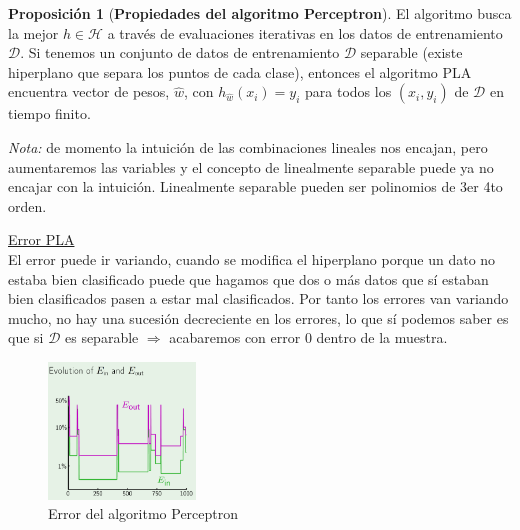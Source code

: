 \documentclass[11pt,a4paper]{article}
\theoremstyle{definition}
\newtheorem{proposition}{Proposición}[section]
\begin{document}
	\begin{proposition}[\bf Propiedades del algoritmo Perceptron]
	El algoritmo busca la mejor $h\in \mathcal{H}$ a través de evaluaciones iterativas en los datos de entrenamiento $\mathcal{D}$. Si tenemos un conjunto de datos de entrenamiento $\mathcal{D}$ separable (existe hiperplano que separa los puntos de cada clase), entonces el algoritmo PLA encuentra vector de pesos, $\hat w$, con $h_{\hat w}(x_i)=y_i$ para todos los $(x_i,y_i)$ de $\mathcal{D}$ en tiempo finito.
	
	\end{proposition}
	
	\textit{Nota:} de momento la intuición de las combinaciones lineales nos encajan, pero aumentaremos las variables y el concepto de linealmente separable puede ya no encajar con la intuición. Linealmente separable pueden ser polinomios de 3er 4to orden.
	
	\underline{Error PLA}\\
	El error puede ir variando, cuando se modifica el hiperplano porque un dato no estaba bien clasificado puede que hagamos que dos o más datos que sí estaban bien clasificados pasen a estar mal clasificados. Por tanto los errores van variando mucho, no hay una sucesión decreciente en los errores, lo que sí podemos saber es que si $\mathcal{D}$ es separable $\Rightarrow$ acabaremos con error 0 dentro de la muestra.
	
	\begin{figure}[H]
	\centering
	\includegraphics[width=0.35\textwidth]{images/error_pla}
	\caption{Error del algoritmo Perceptron}
	\end{figure}
\end{document}

